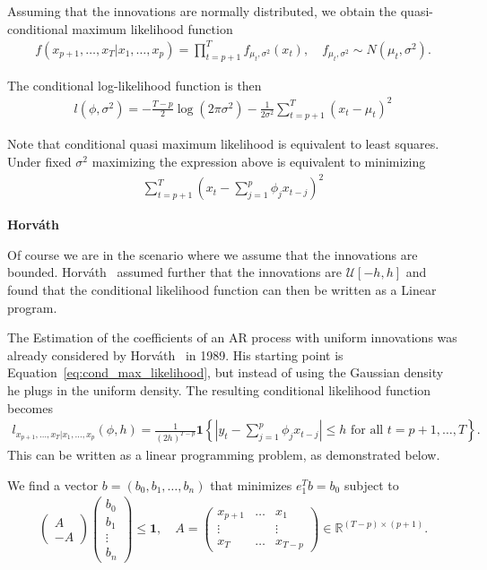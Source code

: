 Assuming that the innovations are normally distributed, we obtain the quasi-conditional maximum likelihood function
\begin{align*}
    f(x_{p+1},\dots,x_T|x_1,\dots,x_p)=\prod_{t=p+1}^{T}f_{\mu_t,\sigma^2}(x_t),\quad f_{\mu_t,\sigma^2}\sim N(\mu_t,\sigma^2).
\end{align*}

The conditional log-likelihood function is then
\begin{align*}
    l(\phi,\sigma^2)=-\frac{T-p}{2}\log{(2\pi\sigma^2)}-\frac{1}{2\sigma^2}\sum_{t=p+1}^{T}(x_t-\mu_t)^2
\end{align*}

Note that conditional quasi maximum likelihood is equivalent to least squares. Under fixed $\sigma^2$ maximizing the expression above is equivalent to minimizing
\begin{align*}
    \sum_{t=p+1}^{T}\left(x_t-\sum_{j=1}^{p}\phi_jx_{t-j}\right)^2
\end{align*}

\textbf{Horváth}

Of course we are in the scenario where we assume that the innovations are bounded. Horváth~\cite{horvath_ar_1989} assumed further that the innovations are $\mathcal{U}[-h,h]$ and found that the conditional likelihood function can then be written as a Linear program.

The Estimation of the coefficients of an AR process with uniform innovations was already considered by Horváth~\cite{horvath_ar_1989} in 1989. His starting point is Equation~\eqref{eq:cond_max_likelihood}, but instead of using the Gaussian density he plugs in the uniform density. The resulting conditional likelihood function becomes
\begin{align}\label{eq:cond_max_likelihood_uniform}
    l_{x_{p+1},\dots,x_T|x_1,\dots,x_p}(\phi,h)=\frac{1}{(2h)^{T-p}}\mathbf{1}\left\{\left|y_t-\sum_{j=1}^{p}\phi_jx_{t-j}\right|\le h\text{ for all }t=p+1,\dots,T\right\}.
\end{align}
This can be written as a linear programming problem, as demonstrated below.

We find a vector $b=(b_0,b_1,\dots,b_n)$ that minimizes $e_1^Tb=b_0$ subject to
\begin{align*}
    \begin{pmatrix}
        A\\
        -A
    \end{pmatrix}\begin{pmatrix}
        b_0\\
        b_1\\
        \vdots\\
        b_n
    \end{pmatrix}\le\mathbf{1},\quad A=\begin{pmatrix}
        x_{p+1} & \dots & x_1\\
        \vdots & & \vdots\\
        x_T & \dots & x_{T-p}
    \end{pmatrix}\in\mathbb{R}^{(T-p)\times(p+1)}.
\end{align*}

